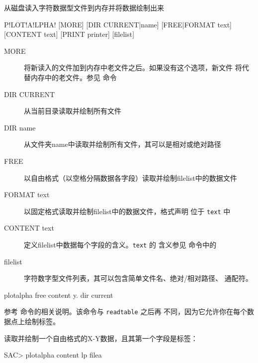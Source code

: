 \label{cmd:plotalpha}

从磁盘读入字符数据型文件到内存并将数据绘制出来

\begin{SACSTX}
P!LOT!A!LPHA! [MORE] [DIR CURRENT|name] [FREE|FORMAT text] [CONTENT text]
    [PRINT printer] [filelist]
\end{SACSTX}

\begin{description}
\item [MORE] 将新读入的文件加到内存中老文件之后。如果没有这个选项，新文件
    将代替内存中的老文件。参见  命令
\item [DIR CURRENT] 从当前目录读取并绘制所有文件
\item [DIR name] 从文件夹name中读取并绘制所有文件，其可以是相对或绝对路径
\item [FREE] 以自由格式（以空格分隔数据各字段）读取并绘制filelist中的数据文件
\item [FORMAT text] 以固定格式读取并绘制filelist中的数据文件，格式声明
    位于 \texttt{text} 中
\item [CONTENT text] 定义filelist中数据每个字段的含义。\texttt{text} 的
    含义参见  命令中的
\item [filelist] 字符数字型文件列表，其可以包含简单文件名、绝对/相对路径、
    通配符。
\end{description}

\begin{SACDFT}
plotalpha free content y. dir current
\end{SACDFT}

参考  命令的相关说明。该命令与 \texttt{readtable}
之后再  不同，因为它允许你在每个数据点上绘制标签。

读取并绘制一个自由格式的X-Y数据，且其第一个字段是标签：
\begin{SACCode}
SAC> plotalpha content lp filea
\end{SACCode}
